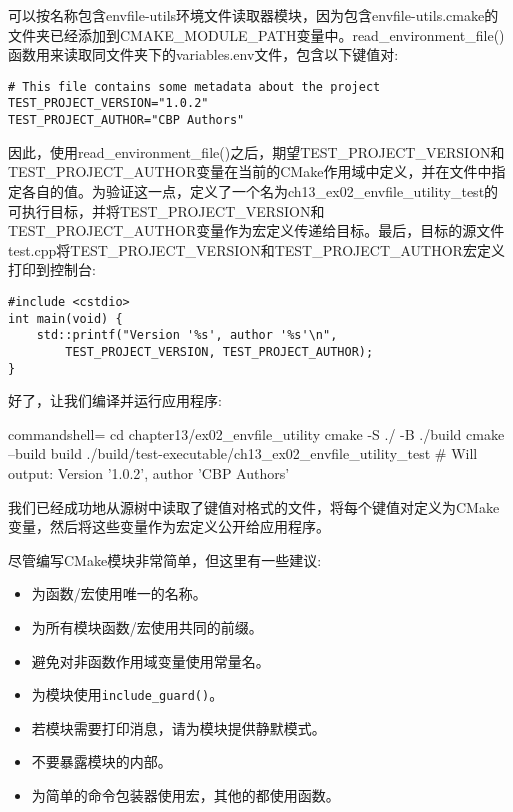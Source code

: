 可以按名称包含envfile-utils环境文件读取器模块，因为包含envfile-utils.cmake的文件夹已经添加到CMAKE\_MODULE\_PATH变量中。read\_environment\_file()函数用来读取同文件夹下的variables.env文件，包含以下键值对:

\begin{lstlisting}[style=styleCMake]
# This file contains some metadata about the project
TEST_PROJECT_VERSION="1.0.2"
TEST_PROJECT_AUTHOR="CBP Authors"
\end{lstlisting}

因此，使用read\_environment\_file()之后，期望TEST\_PROJECT\_VERSION和TEST\_PROJECT\_AUTHOR变量在当前的CMake作用域中定义，并在文件中指定各自的值。为验证这一点，定义了一个名为ch13\_ex02\_envfile\_utility\_test的可执行目标，并将TEST\_PROJECT\_VERSION和TEST\_PROJECT\_AUTHOR变量作为宏定义传递给目标。最后，目标的源文件test.cpp将TEST\_PROJECT\_VERSION和TEST\_PROJECT\_AUTHOR宏定义打印到控制台:

\begin{lstlisting}[style=styleCXX]
#include <cstdio>
int main(void) {
	std::printf("Version '%s', author '%s'\n",
		TEST_PROJECT_VERSION, TEST_PROJECT_AUTHOR);
}
\end{lstlisting}

好了，让我们编译并运行应用程序:

\begin{tcblisting}{commandshell={}}
cd chapter13/ex02_envfile_utility
cmake -S ./ -B ./build
cmake --build build
./build/test-executable/ch13_ex02_envfile_utility_test
# Will output: Version '1.0.2', author 'CBP Authors'
\end{tcblisting}

我们已经成功地从源树中读取了键值对格式的文件，将每个键值对定义为CMake变量，然后将这些变量作为宏定义公开给应用程序。

尽管编写CMake模块非常简单，但这里有一些建议:

\begin{itemize}
\item 
为函数/宏使用唯一的名称。

\item 
为所有模块函数/宏使用共同的前缀。

\item 
避免对非函数作用域变量使用常量名。

\item 
为模块使用\texttt{include\_guard()}。

\item 
若模块需要打印消息，请为模块提供静默模式。

\item 
不要暴露模块的内部。

\item 
为简单的命令包装器使用宏，其他的都使用函数。
\end{itemize}

